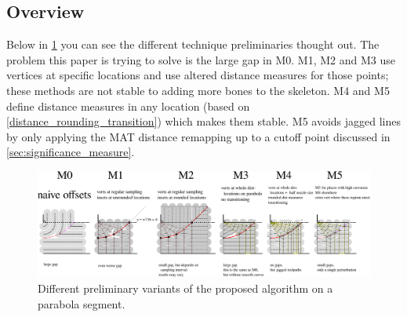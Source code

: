 \subsection{Overview}
Below in \cref{parabola_switch_to_less_lines} you can see the different technique preliminaries thought out.
The problem this paper is trying to solve is the large gap in M0.
M1, M2 and M3 use vertices at specific locations and use altered distance measures for those points; these methods are not stable to adding more bones to the skeleton.
M4 and M5 define distance measures in any location (based on \cref{distance_rounding_transition}) which makes them stable.
M5 avoids jagged lines by only applying the MAT distance remapping up to a cutoff point discussed in \cref{sec:significance_measure}.


\begin{figure}
\includegraphics[width=\textwidth]{sources/method/parabola_switch_to_less_lines.pdf}
\caption{Different preliminary variants of the proposed algorithm on a parabola segment.}
\label{parabola_switch_to_less_lines}
\end{figure}

























































